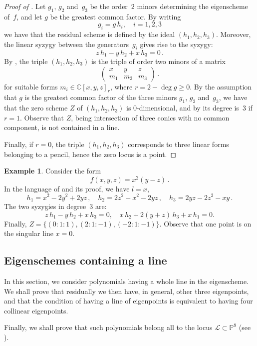 \documentclass[a4paper, 11pt, reqno]{amsart}
\theoremstyle{plain}
\theoremstyle{definition}
\newtheorem{es}[lemma]{Example}
\newcommand{\C}{\mathbb{C}}
\newcommand{\p}{\mathbb{P}}
\newcommand{\sL}{\mathcal{L}}
\begin{document}
\begin{proof}[Proof of ]
Let $g_1$, $g_2$ and~$g_3$ be the order~$2$ minors determining the eigenscheme of~$f$, and let $g$ be the greatest common factor.
By writing
%
\[
  g_i = g \, h_i, \quad i=1,2,3
\]
%
we have that the residual scheme is defined by the ideal
$(h_1,h_2,h_3)$. Moreover, the
linear
syzygy between the generators~$g_i$ gives rise to the syzygy:
%
\[
  z\, h_1 - y\, h_2 + x\, h_3 = 0 \,.
\]
%
By , the triple $(h_1,h_2,h_3)$ is the triple of order two minors of a matrix
%
\[
  \begin{pmatrix}
    x & y & z \\
    m_1 & m_2 & m_3
  \end{pmatrix} \,.
\]
%
for suitable forms $m_i \in \C[x,y,z]_r$, where $r =2 - \deg g \ge 0$.
By the assumption that $g$ is the greatest common factor of the three minors $g_1$, $g_2$ and~$g_3$,
we have that the zero scheme $Z$ of $(h_1,h_2,h_3)$ is $0$-dimensional, and
by  its degree is~$3$ if $r=1$. Observe that $Z$, being intersection of three conics with no common component, is not contained in a line. 

Finally, if $r=0$, the triple $(h_1,h_2,h_3)$ corresponds to three linear forms belonging to a pencil, hence the zero locus is a point.
\end{proof}


\begin{es}
Consider the form
%
\[
  f(x, y, z) = x^2 (y - z) \,.
\]
%
In the language of  and its proof, we have $l=x$,
%
\[
 h_1 = x^2-2y^2+2y z \,, \quad 
 h_2 = 2z^2-x^2-2y z \,, \quad 
 h_3 = 2yz-2z^2-xy \,.
\]
%
The two syzygies in degree~$3$ are:
%
\[
  z \, h_1 - y \, h_2 + x \, h_3 = 0, \quad x \, h_2 + 2(y+z) \, h_3 + x \, h_1 = 0.
\]
%
Finally, $Z = \{ (0:1:1),(2:1:-1),(-2:1:-1) \}$.
Observe that one point is on the singular line $x=0$.
\end{es}

\subsection{Eigenschemes containing a line}

In this section, we consider polynomials having a whole line in the eigenscheme. We shall prove that residually we then have, in general, other three eigenpoints, and that the condition of having a line of eigenpoints is equivalent to having four collinear eigenpoints.

Finally, we shall prove that such polynomials belong all to the locus $\sL \subset \p^9$ (see ).
\end{document}
